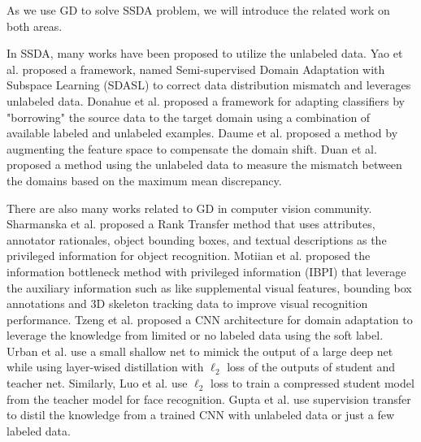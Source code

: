 As we use GD to solve SSDA problem, we will introduce the related work on both areas.

In SSDA, many works have been proposed to utilize the unlabeled data. Yao {et al.} \cite{yao2015semi} proposed a framework, named Semi-supervised Domain Adaptation with Subspace Learning (SDASL) to correct data distribution mismatch and leverages unlabeled data. Donahue {et al.}\cite{Donahue_2013_CVPR} proposed a framework for adapting classifiers by "borrowing" the source data to the target domain using a combination of available labeled and unlabeled examples. Daume {et al.} \cite{daume2010frustratingly} proposed a method by augmenting the feature space to compensate the domain shift. Duan {et al.} \cite{duan2012visual} proposed a method using the unlabeled data to measure the mismatch between the domains based on the maximum mean discrepancy.

There are also many works related to GD in computer vision community. Sharmanska et al. \cite{Sharmanska_2013_ICCV} proposed a Rank Transfer method that uses attributes, annotator
rationales, object bounding boxes, and textual descriptions as the privileged information for object recognition. Motiian et al. \cite{Motiian_2016_CVPR} proposed {the information bottleneck method with privileged information (IBPI)} that leverage the auxiliary information such as like supplemental visual features, bounding box annotations and 3D skeleton tracking data to improve visual recognition performance. Tzeng et al. \cite{Tzeng_2015_ICCV} proposed a CNN architecture for domain adaptation to leverage the knowledge from limited or no labeled data using the soft label. Urban et al. \cite{urban2016deep} use a small shallow net to mimick the output of a large deep net while using layer-wised distillation with $\ell_2$ loss of the outputs of student and teacher net. Similarly, Luo et al. \cite{luo2016face} use $\ell_2$ loss to train a compressed student model from the teacher model for face recognition. Gupta et al. \cite{Gupta_2016_CVPR} use supervision transfer to distil the knowledge from a trained CNN with unlabeled data or just a few labeled data.